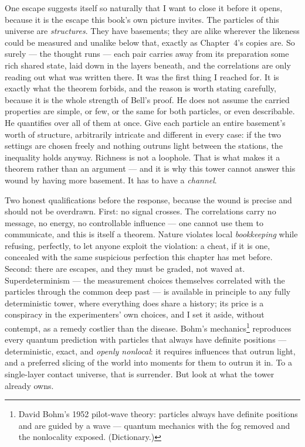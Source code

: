 \documentclass[fontsize=11pt,paper=a4,pagesize=auto,parskip=half-]{scrbook}
\begin{document}
One escape suggests itself so naturally that I want to close it before it opens, because it is the escape this book's own picture invites. The particles of this universe are \emph{structures}. They have basements; they are alike wherever the likeness could be measured and unalike below that, exactly as Chapter~4's copies are. So surely --- the thought runs --- each pair carries away from its preparation some rich shared state, laid down in the layers beneath, and the correlations are only reading out what was written there. It was the first thing I reached for. It is exactly what the theorem forbids, and the reason is worth stating carefully, because it is the whole strength of Bell's proof. He does not assume the carried properties are simple, or few, or the same for both particles, or even describable. He quantifies over all of them at once. Give each particle an entire basement's worth of structure, arbitrarily intricate and different in every case: if the two settings are chosen freely and nothing outruns light between the stations, the inequality holds anyway. Richness is not a loophole. That is what makes it a theorem rather than an argument --- and it is why this tower cannot answer this wound by having more basement. It has to have a \emph{channel}.

Two honest qualifications before the response, because the wound is precise and should not be overdrawn. First: no signal crosses. The correlations carry no message, no energy, no controllable influence --- one cannot use them to communicate, and this is itself a theorem. Nature violates local \emph{bookkeeping} while refusing, perfectly, to let anyone exploit the violation: a cheat, if it is one, concealed with the same suspicious perfection this chapter has met before. Second: there are escapes, and they must be graded, not waved at. Superdeterminism --- the measurement choices themselves correlated with the particles through the common deep past --- is available in principle to any fully deterministic tower, where everything does share a history; its price is a conspiracy in the experimenters' own choices, and I set it aside, without contempt, as a remedy costlier than the disease. Bohm's mechanics\footnote{David Bohm's 1952 pilot-wave theory: particles always have definite positions and are guided by a wave --- quantum mechanics with the fog removed and the nonlocality exposed. (Dictionary.)} reproduces every quantum prediction with particles that always have definite positions --- deterministic, exact, and \emph{openly nonlocal}: it requires influences that outrun light, and a preferred slicing of the world into moments for them to outrun it in. To a single-layer contact universe, that is surrender. But look at what the tower already owns.
\end{document}
